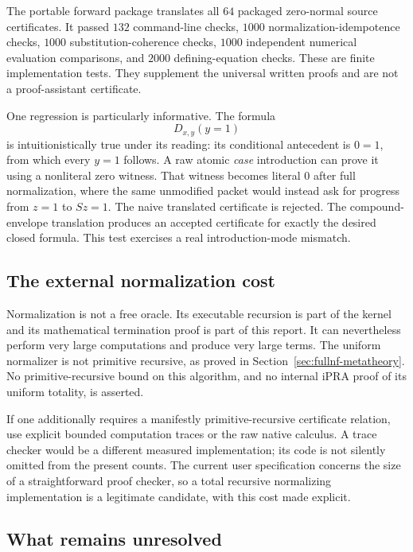 \documentclass[11pt,letterpaper]{article}
\theoremstyle{definition}
\theoremstyle{remark}
\begin{document}
The portable forward package translates all $64$ packaged
zero-normal source certificates. It passed $132$ command-line
checks, $1000$ normalization-idempotence checks, $1000$
substitution-coherence checks, $1000$ independent numerical
evaluation comparisons, and $2000$ defining-equation checks.
These are finite implementation tests. They supplement the
universal written proofs and are not a proof-assistant certificate.

One regression is particularly informative. The formula
\[
 D_{x,y}(y=1)
\]
is intuitionistically true under its reading: its conditional
antecedent is $0=1$, from which every $y=1$ follows.
A raw atomic \emph{case} introduction can prove it using a
nonliteral zero witness. That witness becomes literal $0$
after full normalization, where the same unmodified packet
would instead ask for progress from $z=1$ to $Sz=1$.
The naive translated certificate is rejected.
The compound-envelope translation produces an accepted
certificate for exactly the desired closed formula.
This test exercises a real introduction-mode mismatch.

\subsection{The external normalization cost}

Normalization is not a free oracle. Its executable recursion
is part of the kernel and its mathematical termination proof
is part of this report. It can nevertheless perform very
large computations and produce very large terms. The uniform
normalizer is not primitive recursive, as proved in
Section~\ref{sec:fullnf-metatheory}. No primitive-recursive bound
on this algorithm, and no internal iPRA proof of its uniform
totality, is asserted.

If one additionally requires a manifestly primitive-recursive
certificate relation, use explicit bounded computation traces
or the raw native calculus. A trace checker would be a different
measured implementation; its code is not silently omitted from
the present counts. The current user specification concerns
the size of a straightforward proof checker, so a total recursive
normalizing implementation is a legitimate candidate, with
this cost made explicit.

\subsection{What remains unresolved}
\end{document}
